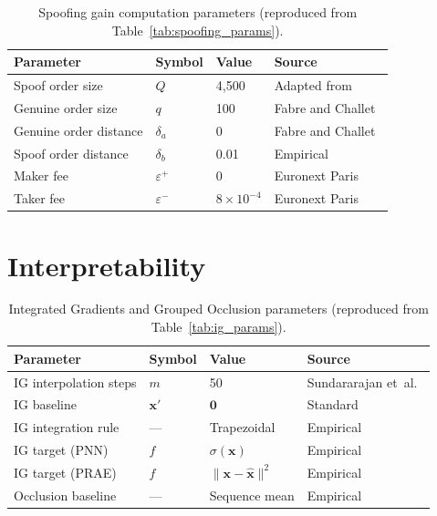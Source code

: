 \documentclass[11pt]{report}
\begin{document}
\begin{table}[H]
\centering
\caption{Spoofing gain computation parameters (reproduced from Table~\ref{tab:spoofing_params}).}
\label{tab:app_spoofing}
\begin{tabular}{llll}
\toprule
\textbf{Parameter} & \textbf{Symbol} & \textbf{Value} & \textbf{Source} \\
\midrule
Spoof order size & $Q$ & 4{,}500 & Adapted from~\cite{fabre_2025} \\
Genuine order size & $q$ & 100 & Fabre and Challet~\cite{fabre_2025} \\
Genuine order distance & $\delta_a$ & 0 & Fabre and Challet~\cite{fabre_2025} \\
Spoof order distance & $\delta_b$ & 0.01 & Empirical \\
Maker fee & $\varepsilon^+$ & 0 & Euronext Paris \\
Taker fee & $\varepsilon^-$ & $8 \times 10^{-4}$ & Euronext Paris \\
\bottomrule
\end{tabular}
\end{table}

\section{Interpretability}\label{app:hyperparams:interp}

\begin{table}[H]
\centering
\caption{Integrated Gradients and Grouped Occlusion parameters (reproduced from Table~\ref{tab:ig_params}).}
\label{tab:app_interp}
\begin{tabular}{llll}
\toprule
\textbf{Parameter} & \textbf{Symbol} & \textbf{Value} & \textbf{Source} \\
\midrule
IG interpolation steps & $m$ & 50 & Sundararajan et~al.~\cite{sundararajan2017axiomaticattributiondeepnetworks} \\
IG baseline & $\mathbf{x}'$ & $\mathbf{0}$ & Standard \\
IG integration rule & --- & Trapezoidal & Empirical \\
IG target (PNN) & $f$ & $\sigma(\mathbf{x})$ & Empirical \\
IG target (PRAE) & $f$ & $\|\mathbf{x} - \hat{\mathbf{x}}\|^2$ & Empirical \\
Occlusion baseline & --- & Sequence mean & Empirical \\
\bottomrule
\end{tabular}
\end{table}
\end{document}
